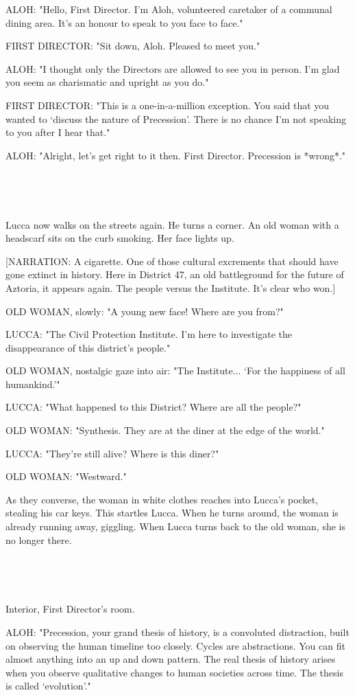 \documentclass[11pt]{article}
\begin{document}
ALOH: "Hello, First Director. 
I'm Aloh, volunteered caretaker of a communal dining area.
It's an honour to speak to you face to face."

FIRST DIRECTOR: "Sit down, Aloh. 
Pleased to meet you."

ALOH: "I thought only the Directors are allowed to see you in person.
I'm glad you seem as charismatic and upright as you do."

FIRST DIRECTOR: "This is a one-in-a-million exception.
You said that you wanted to `discuss the nature of Precession'. 
There is no chance I'm not speaking to you after I hear that."

ALOH: "Alright, let's get right to it then. 
First Director. 
Precession is *wrong*."

\ 

\ 

Lucca now walks on the streets again.
He turns a corner.
An old woman with a headscarf sits on the curb smoking.
Her face lights up.

[NARRATION: A cigarette. 
One of those cultural excrements that should have gone extinct in history.
Here in District 47, an old battleground for the future of Aztoria, it appears again.
The people versus the Institute. 
It's clear who won.]

OLD WOMAN, slowly: "A young new face! Where are you from?"

LUCCA: "The Civil Protection Institute. I'm here to investigate the disappearance of this district's people."

OLD WOMAN, nostalgic gaze into air: "The Institute...
`For the happiness of all humankind.'"

LUCCA: "What happened to this District?
Where are all the people?"

OLD WOMAN: "Synthesis.
They are at the diner at the edge of the world."

LUCCA: "They're still alive? Where is this diner?"

OLD WOMAN: "Westward."

As they converse, the woman in white clothes reaches into Lucca's pocket, stealing his car keys. 
This startles Lucca.
When he turns around, the woman is already running away, giggling.
When Lucca turns back to the old woman, she is no longer there.

\ 

\ 

Interior, First Director's room.

ALOH: "Precession, your grand thesis of history, is a convoluted distraction, built on observing the human timeline too closely.
Cycles are abstractions. You can fit almost anything into an up and down pattern.
The real thesis of history arises when you observe qualitative changes to human societies across time.
The thesis is called `evolution'."
\end{document}

